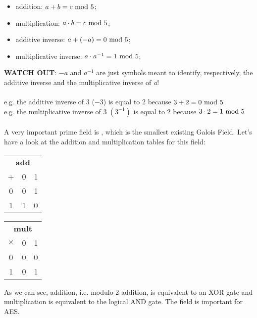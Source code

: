 \begin{itemize}
    \item addition: $a+b=c\text{ mod }5$;
    \item multiplication: $a\cdot b=c\text{ mod }5$;
    \item additive inverse: $a+(-a)=0\text{ mod }5$;
    \item multiplicative inverse: $a\cdot a^{-1}=1\text{ mod }5$;
\end{itemize}
\textbf{WATCH OUT}: $-a$ and $a^{-1}$ are just symbols meant to identify, respectively, the additive inverse and the multiplicative inverse of \textit{a}!\\\\
e.g. the additive inverse of 3 ($-3$) is equal to 2 because $3+2=0\text{ mod }5$\\
e.g. the multiplicative inverse of 3 $\left(3^{-1}\right)$ is equal to 2 because $3\cdot2=1\text{ mod }5$\\\\
A very important prime field is , which is the smallest existing Galois Field. Let's have a look at the addition and multiplication tables for this field:
\begin{center}
    \begin{tabular}{c|cc}
         \multicolumn{3}{c}{\textbf{add}}\\
         +&0&1\\
         \hline
         0&0&1\\
         1&1&0
    \end{tabular}\qquad
    \begin{tabular}{c|cc}
         \multicolumn{3}{c}{\textbf{mult}}\\
         $\times$&0&1\\
         \hline
         0&0&0\\
         1&0&1
    \end{tabular}
\end{center}
As we can see,  addition, i.e. modulo 2 addition, is equivalent to an XOR gate and  multiplication is equivalent to the logical AND gate. The field  is important for AES.

\newpage
